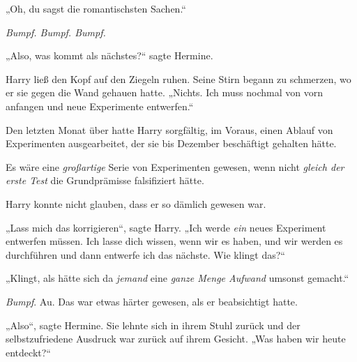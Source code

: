 „Oh, du sagst die romantischsten Sachen.“

\emph{Bumpf. Bumpf. Bumpf.}

„Also, was kommt als nächstes?“ sagte Hermine.

Harry ließ den Kopf auf den Ziegeln ruhen. Seine Stirn begann zu schmerzen, wo er sie gegen die Wand gehauen hatte.
„Nichts. Ich muss nochmal von vorn anfangen und neue Experimente entwerfen.“

Den letzten Monat über hatte Harry sorgfältig, im Voraus, einen Ablauf von Experimenten ausgearbeitet, der sie bis Dezember beschäftigt gehalten hätte.

Es wäre eine \emph{großartige} Serie von Experimenten gewesen, wenn nicht \emph{gleich der erste Test} die Grundprämisse falsifiziert hätte.

Harry konnte nicht glauben, dass er so dämlich gewesen war.

„Lass mich das korrigieren“, sagte Harry.
„Ich werde \emph{ein} neues Experiment entwerfen müssen. Ich lasse dich wissen, wenn wir es haben, und wir werden es durchführen und dann entwerfe ich das nächste. Wie klingt das?“

„Klingt, als hätte sich da \emph{jemand} eine \emph{ganze Menge Aufwand} umsonst gemacht.“

\emph{Bumpf}. Au. Das war etwas härter gewesen, als er beabsichtigt hatte.

„Also“, sagte Hermine. Sie lehnte sich in ihrem Stuhl zurück und der selbstzufriedene Ausdruck war zurück auf ihrem Gesicht.
„Was haben wir heute entdeckt?“

